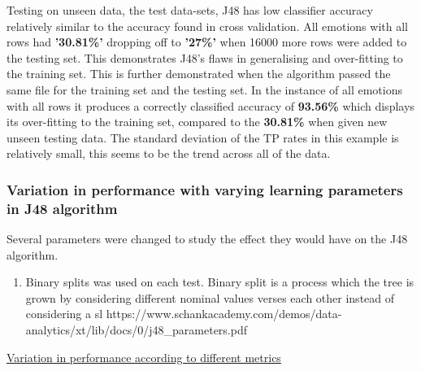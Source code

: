 Testing on unseen data, the test data-sets, J48 has low classifier accuracy relatively similar to the accuracy found in cross validation. All emotions with all rows had \textbf{'30.81\%'} dropping off to \textbf{'27\%' }when 16000 more rows were added to the testing set. This demonstrates J48's flaws in generalising and over-fitting to the training set. This is further demonstrated when the algorithm passed the same file for the training set and the testing set. In the instance of all emotions with all rows it produces a correctly classified accuracy of \textbf{93.56\%} which displays its over-fitting to the training set, compared to the \textbf{30.81\%} when given new unseen testing data. The standard deviation of the TP rates in this example is relatively small, this seems to be the trend across all of the data. 


\subsubsection{Variation in performance with varying learning parameters in J48 algorithm}

Several parameters were changed to study the effect they would have on the J48 algorithm.

\begin{enumerate}
\item Binary splits was used on each test. Binary split is a process which the tree is grown by considering different nominal values verses each other instead of considering a sl
https://www.schankacademy.com/demos/data-analytics/xt/lib/docs/0/j48\_parameters.pdf
\end{enumerate}


\raggedright\underline{Variation in performance according to different metrics}




